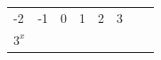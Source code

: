 {{\begin{center}
\begin{tabular}[t]{|l|l|l|l|l|l|l|l|}
    
        -2 &
    
    
        -1 &
    
    
        0 &
    
    
        1 &
    
    
        2 &
    
    
        3%
     \tabularnewline\cline{1-1}\cline{2-2}\cline{3-3}\cline{4-4}\cline{5-5}\cline{6-6}\cline{7-7}\cline{8-8}
    
    
        
                \begin{math}{3}^{x}\end{math}
               &
    
    
         &
    

\end{tabular}
\end{center}}}
